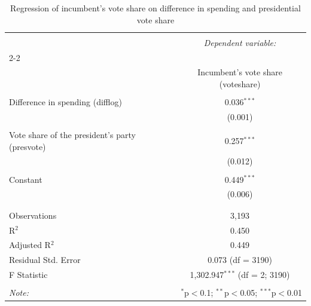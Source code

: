 
\begin{table}[H] \centering 
  \caption{Regression of incumbent's vote share on difference in spending and presidential vote share} 
  \label{tab:regression_q5} 
\begin{tabular}{@{\extracolsep{5pt}}lc} 
\\[-1.8ex]\hline 
\hline \\[-1.8ex] 
 & \multicolumn{1}{c}{\textit{Dependent variable:}} \\ 
\cline{2-2} 
\\[-1.8ex] & Incumbent's vote share (voteshare) \\ 
\hline \\[-1.8ex] 
 Difference in spending (difflog) & 0.036$^{***}$ \\ 
  & (0.001) \\ 
  & \\ 
 Vote share of the president's party (presvote) & 0.257$^{***}$ \\ 
  & (0.012) \\ 
  & \\ 
 Constant & 0.449$^{***}$ \\ 
  & (0.006) \\ 
  & \\ 
\hline \\[-1.8ex] 
Observations & 3,193 \\ 
R$^{2}$ & 0.450 \\ 
Adjusted R$^{2}$ & 0.449 \\ 
Residual Std. Error & 0.073 (df = 3190) \\ 
F Statistic & 1,302.947$^{***}$ (df = 2; 3190) \\ 
\hline 
\hline \\[-1.8ex] 
\textit{Note:}  & \multicolumn{1}{r}{$^{*}$p$<$0.1; $^{**}$p$<$0.05; $^{***}$p$<$0.01} \\ 
\end{tabular} 
\end{table}  

